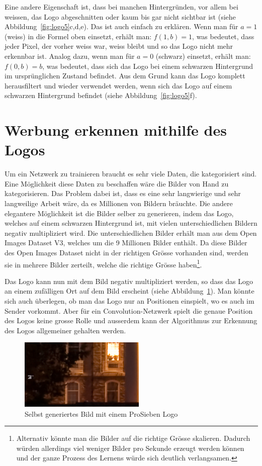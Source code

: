 \documentclass[12pt,a4paper]{report}
\begin{document}
Eine andere Eigenschaft ist, dass bei manchen Hintergründen,
vor allem bei weissen, das Logo abgeschnitten oder kaum bis gar nicht sichtbar ist (siehe Abbildung~\ref{fig:logo5}c,d,e).
Das ist auch einfach zu erklären.
Wenn man für $a = 1$ (weiss) in die Formel oben einsetzt, erhält man: $f(1, b) = 1$,
was bedeutet, dass jeder Pixel, der vorher weiss war, weiss bleibt und so das Logo nicht mehr erkennbar ist.
Analog dazu, wenn man für $a = 0$ (schwarz) einsetzt, erhält man: $f(0, b) = b$, was bedeutet, dass sich das Logo bei einem schwarzen Hintergrund
im ursprünglichen Zustand befindet.
Aus dem Grund kann das Logo komplett herausfiltert und wieder verwendet werden, wenn sich das Logo auf einem schwarzen Hintergrund befindet (siehe Abbildung~\ref{fig:logo5}f).

\section{Werbung erkennen mithilfe des Logos}
Um ein Netzwerk zu trainieren braucht es sehr viele Daten, die kategorisiert sind.
Eine Möglichkeit diese Daten zu beschaffen wäre die Bilder von Hand zu kategorisieren.
Das Problem dabei ist, dass es eine sehr langwierige und sehr langweilige Arbeit wäre,
da es Millionen von Bildern bräuchte.
Die andere elegantere Möglichkeit ist die Bilder selber zu generieren,
indem das Logo, welches auf einem schwarzen Hintergrund ist, mit vielen unterschiedlichen Bildern negativ multipliziert wird.
Die unterschiedlichen Bilder erhält man aus dem Open Images Dataset V3\cite{openimages}, welches um die 9 Millionen Bilder enthält.
Da diese Bilder des Open Images Dataset nicht in der richtigen Grösse vorhanden sind, werden sie in mehrere Bilder zerteilt, welche die richtige Grösse haben\footnote{
Alternativ könnte man die Bilder auf die richtige Grösse skalieren.
Dadurch würden allerdings viel weniger Bilder pro Sekunde erzeugt werden können und der ganze Prozess des Lernens würde sich deutlich verlangsamen.
}.

Das Logo kann nun mit dem Bild negativ multipliziert werden, so dass das Logo an einem zufälligen Ort auf dem Bild erscheint (siehe Abbildung~\ref{fig:logo8}).
Man könnte sich auch überlegen, ob man das Logo nur an Positionen einspielt, wo es auch im Sender vorkommt.
Aber für ein Convolution-Netzwerk spielt die genaue Position des Logos keine grosse Rolle und ausserdem kann der Algorithmus zur Erkennung des Logos allgemeiner gehalten werden.
\begin{figure}[h]%
    \centering
    \includegraphics[width=6cm]{assets/images/logo_on_random_image.png}%
    \caption{Selbst generiertes Bild mit einem ProSieben Logo}%
    \label{fig:logo8}%
\end{figure}
\end{document}

